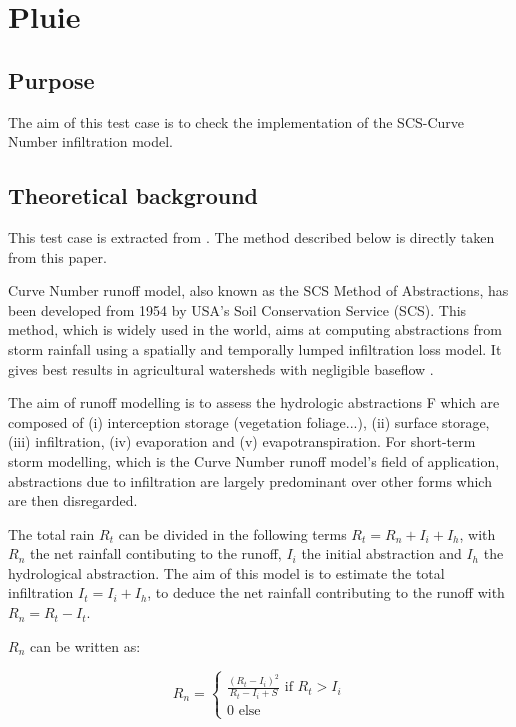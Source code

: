 \chapter{Pluie}\label{chapter:pluie}

\section{Purpose}

The aim of this test case is to check the implementation of the SCS-Curve Number infiltration model.

\section{Theoretical background}

This test case is extracted from \cite{Ligier2016}. The method described below is directly taken from this paper.

Curve Number runoff model, also known as the SCS Method of Abstractions, has been developed from 1954 by USA’s Soil Conservation Service (SCS). This method, which is widely used in the world, aims at computing abstractions from storm rainfall using a spatially and temporally lumped infiltration loss model. It gives best results in agricultural watersheds with negligible baseflow \cite{soil1972national}.

The aim of runoff modelling is to assess the hydrologic abstractions F which are composed of (i) interception storage (vegetation foliage...), (ii) surface storage, (iii) infiltration, (iv) evaporation and (v) evapotranspiration. For short-term storm modelling, which is the Curve Number runoff model's field of application, abstractions due to infiltration are largely predominant over other forms which are then disregarded.

The total rain $R_t$ can be divided in the following terms $R_t=R_n+I_i+I_h$, with $R_n$ the net rainfall contibuting to the runoff, $I_i$ the initial abstraction and $I_h$ the hydrological abstraction. The aim of this model is to estimate the total infiltration $I_t=I_i+I_h$, to deduce the net rainfall contributing to the runoff with $R_n=R_t-I_t$.

$R_n$ can be written as:

\begin{equation}
  R_n=\left\{\begin{array}{l}
    \frac{(R_t-I_i)^2}{R_t-I_i+S} \text{ if } R_t>I_i\\
    0 \text{ else}
  \end{array} \right.
\end{equation}

